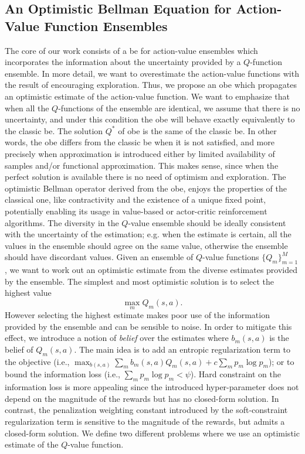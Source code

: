 \subsection{An Optimistic Bellman Equation for Action-Value Function Ensembles}
The core of our work consists of a \gls{be} for action-value ensembles which incorporates the information about the uncertainty provided by a $Q$-function ensemble.
In more detail, we want to overestimate the action-value functions with the result of encouraging exploration.   
Thus, we propose an \gls{obe} which propagates an optimistic estimate of the action-value function. 
We want to emphasize that when all the $Q$-functions of the ensemble are identical, we assume that there is no uncertainty, and under this condition the \gls{obe} will behave exactly equivalently to the classic \gls{be}. The solution $Q^*$ of \gls{obe} is the same of the classic \gls{be}. In other words, the \gls{obe} differs from the classic \gls{be} when it is not satisfied, and more precisely when approximation is introduced either by limited availability of samples and/or functional approximation. This makes sense, since when the perfect solution is available there is no need of optimism and exploration. 
The optimistic Bellman operator derived from the \gls{obe}, enjoys the properties of the classical one, like contractivity and the existence of a unique fixed point, potentially enabling its usage in value-based or actor-critic reinforcement algorithms. 
The diversity in the $Q$-value ensemble should be ideally consistent with the uncertainty of the estimation; e.g. when the estimate is certain, all the values in the ensemble should agree on the same value, otherwise the ensemble should have discordant values.
Given an ensemble of $Q$-value functions $\{Q_m\}_{m=1}^M$, we want to work out an optimistic estimate from the diverse estimates provided by the ensemble. The simplest and most optimistic solution is to select the highest value 
\begin{equation}
\max_m Q_m(s,a).\nonumber
\end{equation} 
However selecting the highest estimate makes poor use of the information provided by the ensemble and can be sensible to noise. In order to mitigate this effect, we introduce a notion of \textit{belief} over the estimates where $b_m(s,a)$ is the belief of $Q_m(s,a)$. The main idea is to add an entropic regularization term to the objective (i.e., $\max_{b(s,a)} \sum_m b_m(s,a) Q_m(s,a) + c \sum_{m} p_m \log p_m $); or to bound the information loss (i.e., $\sum_m p_m \log p_m < \psi$). Hard constraint on the information loss is more appealing since the introduced hyper-parameter does not depend on the magnitude of the rewards but has no closed-form solution. In contrast, the penalization weighting constant introduced by the soft-constraint regularization term is sensitive to the magnitude of the rewards, but admits a closed-form solution.
We define two different problems where we use an optimistic estimate of the $Q$-value function.

